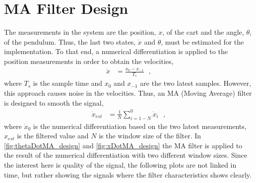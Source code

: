 \section{MA Filter Design}
The measurements in the system are the position, $x$, of the cart and the angle, $\theta$, of the pendulum. Thus, the last two states, $\dot{x}$ and $\dot{\theta}$, must be estimated for the implementation. To that end, a numerical differentiation is applied to the position measurements in order to obtain the velocities,
\begin{align}
  \dot{x} &= \frac{x_0 - x_{-1}}{T_{s}}   \ \ \ ,
  \label{eq:nummericalDiff}
\end{align}
where $T_s$ is the sample time and $x_0$ and $x_{-1}$ are the two latest samples. However, this approach causes noise in the velocities. Thus, an MA (Moving Average) filter is designed to smooth the signal,
%
\begin{align}
  \dot{x}_{est} &= \frac{1}{N}\sum_{i=1-N}^{0} \dot{x}_i   \ \ \ ,
  \label{eq:MA}
\end{align}
%
where $\dot{x}_0$ is the numerical differentiation based on the two latest measurements, $x_{est}$ is the filtered value and $N$ is the window size of the filter. In \autoref{fig:thetaDotMA_design} and \ref{fig:xDotMA_design} the MA filter is applied to the result of the numerical differentiation with two different window sizes. Since the interest here is quality of the signal, the following plots are not linked in time, but rather showing the signals where the filter characteristics shows clearly.
%
